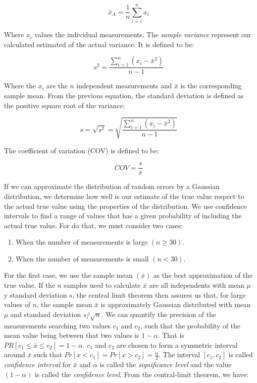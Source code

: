 \documentclass{latex/classes/thesis}
\begin{document}
\begin{equation}
\bar{x}_A = \frac{1}{n}\sum^n_{i = 1}x_i
\end{equation}

Where \(x_i\) values the individual measurements. The \emph{sample variance}
represent our calculated estimated of the actual variance. It is defined to
be:

\begin{equation}
s^2 = \frac{\sum_{i = 1}^n(x_i - \bar{x}^2)}{n - 1}
\end{equation}

Where the \(x_i\) are the \(n\) independent measurements and \(\bar{x}\) is
the corresponding sample mean. From the previous equation, the standard
deviation is defined as the positive square root of the variance:

\begin{equation}
s = \sqrt{s^2} = \sqrt{\frac{\sum_{i = 1}^n(x_i - \bar{x}^2)}{n - 1}}
\end{equation}

The coefficient of variation (COV) is defined to be:

\begin{equation}
  COV = \frac{s}{\bar{x}}
\end{equation}

If we can approximate the distribution of random errors by a Gaussian
distribution, we determine how well is our estimate of the true value respect
to the actual true value using the properties of the distribution. We use
confidence intervals to find a range of values that has a given probability
of including the actual true value. For do that, we must consider two cases:

\begin{enumerate}
\item When the number of measurements is large \((n \ge 30)\).
\item When the number of measurements is small \((n < 30)\).
\end{enumerate}

For the first case, we use the sample mean \((\bar{x})\) as the best
approximation of the true value. If the \(n\) samples used to calculate
\(\bar{x}\) are all independents with mean \(\mu\) y standard deviation
\(s\), the central limit theorem then assures us that, for large values of
\(n\), the sample mean \(\bar{x}\) is approximately Gaussian distributed with
mean \(\mu\) and standard deviation \(s / \sqrt{n}\). We can quantify the
precision of the measurements searching two values \(c_1\) and \(c_2\), such
that the probability of the mean value being between that two values is \(1 -
   \alpha\). That is \(PR[c_1 \le \bar{x} \le c_2] = 1 - \alpha\). \(c_1\) and
\(c_2\) are chosen to form a symmetric interval around \(\bar{x}\) such that
\(Pr[x < c_1] = Pr[x > c_2] = \frac{\alpha}{2}\). The interval \([c_1, c_2]\)
is called \textit{confidence interval} for \(\bar{x}\) and \(\alpha\) is
called the \textit{significance level} and the value \((1 - \alpha)\) is
called the \textit{confidence level}. From the central-limit theorem, we
have:
\end{document}
